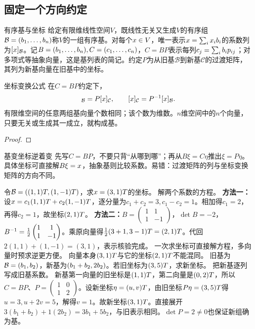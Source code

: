 \subsection{固定一个方向约定}
\begin{definition}{有序基与坐标}
给定有限维线性空间$V$，既线性无关又生成$V$的有序组$\mathcal B=(b_1,\ldots,b_n)$称$V$的一组有序基。对每个$x\in V$，唯一表示$x=\sum_i x_ib_i$的系数列为$[x]_{\mathcal B}$。记$B=(b_1,\ldots,b_n),C=(c_1,\ldots,c_n)$，$C=BP$表示每列$c_j=\sum_ib_i p_{ij}$；对多项式等抽象向量，这是基列表的简记。约定$P$为从旧基$\mathcal B$到新基$\mathcal C$的过渡矩阵，其列为新基向量在旧基中的坐标。
\end{definition}
\begin{theorem}{坐标变换公式}
在$C=BP$约定下，
\begin{equation}[\vx]_{\mathcal B}=P[\vx]_{\mathcal C},\qquad[\vx]_{\mathcal C}=P\inv[\vx]_{\mathcal B}.\label{eq:coordinate}\end{equation}
有限维空间的任意两组基向量个数相同；该个数为维数。$n$维空间中的$n$个向量，只要无关或生成其一成立，就构成基。
\end{theorem}
\begin{proof}

\end{proof}
\begin{method}{基变坐标逆着变}
先写$C=BP$，不要只背“从哪到哪”；再从$B\xi=C\eta$推出$\xi=P\eta$。具体坐标可直接解$B\xi=x$，抽象基则比较系数。易错：过渡矩阵的列与坐标变换矩阵的方向不同。
\end{method}
{令$\mathcal B=((1,1)T,(1,-1)T)$，求$x=(3,1)T$的坐标。}
{解两个系数的方程。}
{\textbf{方法一：}设$x=c_1(1,1)T+c_2(1,-1)T$，逐分量为$c_1+c_2=3,c_1-c_2=1$。相加得$c_1=2$，再得$c_2=1$，故坐标$(2,1)T$。
\textbf{方法二：}$B=\begin{pmatrix}1&1\\1&-1\end{pmatrix}$，$\det B=-2$，$B^{-1}=\frac12\begin{pmatrix}1&1\\1&-1\end{pmatrix}$。乘原向量得$\frac12(3+1,3-1)T=(2,1)T$。代回$2(1,1)+(1,-1)=(3,1)$，表示核验完成。}
{一次求坐标可直接解方程，多向量时预求逆更方便。}
{向量本身$(3,1)T$与它的坐标$(2,1)T$不能混同。}
{旧基为$\mathcal B=(b_1,b_2)$，新基为$(b_1+b_2,2b_2)$。若旧坐标为$(3,5)T$，求新坐标。}
{把新基逐列写成旧基系数。}
{新基第一向量的旧坐标是$(1,1)T$，第二向量是$(0,2)T$，所以$C=BP$、$P=\begin{pmatrix}1&0\\1&2\end{pmatrix}$。设新坐标$\eta=(u,v)T$，由旧坐标$P\eta=(3,5)T$得$u=3,u+2v=5$，解得$v=1$。故新坐标$(3,1)T$。直接展开$3(b_1+b_2)+1(2b_2)=3b_1+5b_2$，与旧表示相同。$\det P=2\ne0$也保证新组确为基。}
